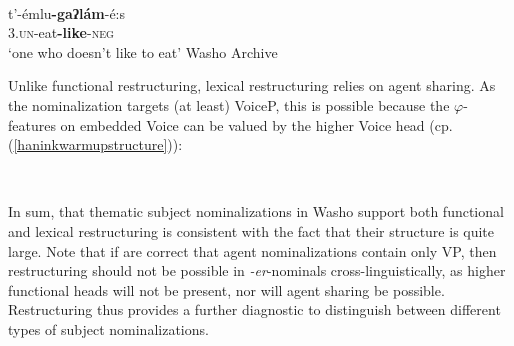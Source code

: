 \documentclass[output=paper]{langscibook}
\begin{document}
 \\
\gll t'-émlu\textbf{-gaʔlám}-é:s\\
{\scshape 3.un}-eat\textbf{-like}-{\scshape neg}\\
\glt `one who doesn't like to eat' \label{haninknoteat}\hfill Washo Archive
\z


Unlike functional restructuring, lexical restructuring relies on agent sharing. As the nominalization targets (at least) VoiceP, this is possible because the $\varphi$-features on embedded Voice can be valued by the higher Voice head (cp. (\ref{haninkwarmupstructure})):

\ea \label{haninksubjectstructure}\

\vspace{-.5em}\hspace{-3em}
 \z 

\vspace{-1em}




In sum, that thematic subject nominalizations in Washo support both functional and lexical restructuring is consistent with the fact that their structure is quite large. Note that if  \cite{bakervinokurova2009} are correct that agent nominalizations contain only VP, then restructuring should not be possible in {\itshape -er}-nominals cross-linguistically, as higher functional heads will not be present, nor will agent sharing be possible. Restructuring thus provides a further diagnostic to distinguish between different types of subject nominalizations.
 
\end{document}
